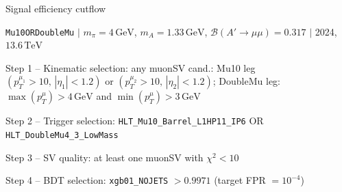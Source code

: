 \documentclass[10pt,a4paper]{article}
\begin{document}
{\large Signal efficiency cutflow

 \texttt{Mu10ORDoubleMu} $|$ $m_{\pi}=4\,\mathrm{GeV}$, $m_{A}=1.33\,\mathrm{GeV}$, $\mathcal{B}(A'\!\to\!\mu\mu)=0.317$ $|$ 2024, $13.6\,\mathrm{TeV}$}

\vspace{0.8em}

Step 1 -- Kinematic selection: any muonSV cand.: Mu10 leg $(p_T^{\mu_1}{>}10,\,|\eta_1|{<}1.2)$ or $(p_T^{\mu_2}{>}10,\,|\eta_2|{<}1.2)$; DoubleMu leg: $\max(p_T^{\mu}){>}4\,\mathrm{GeV}$ and $\min(p_T^{\mu}){>}3\,\mathrm{GeV}$

Step 2 -- Trigger selection: \texttt{HLT\_Mu10\_Barrel\_L1HP11\_IP6} OR \texttt{HLT\_DoubleMu4\_3\_LowMass}

Step 3 -- SV quality: at least one muonSV with $\chi^2<10$

Step 4 -- BDT selection: \texttt{xgb01\_NOJETS} $>0.9971$ (target FPR $=10^{-4}$)

\vspace{0.8em}
\end{document}
